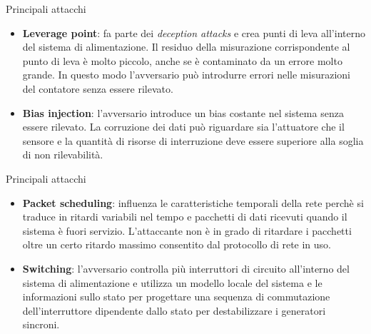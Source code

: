 \documentclass{beamer}
\begin{document}
\begin{frame}{Principali attacchi}
    \begin{itemize}
        \item \textbf{Leverage point}: fa parte dei \textit{deception attacks} e crea punti di leva all'interno del sistema di alimentazione. Il 
        residuo della misurazione corrispondente al punto di leva è molto piccolo, anche se è contaminato da un errore molto grande. In questo modo 
        l'avversario può introdurre errori nelle misurazioni del contatore senza essere rilevato. 
        \item \textbf{Bias injection}: l'avversario introduce un bias costante nel sistema senza essere rilevato. La corruzione dei dati può riguardare
        sia l'attuatore che il sensore e la quantità di risorse di interruzione deve essere superiore alla soglia di non rilevabilità.
    \end{itemize}
\end{frame}

\begin{frame}{Principali attacchi}
    \begin{itemize}
        \item \textbf{Packet scheduling}: influenza le caratteristiche temporali della rete perchè si traduce in ritardi variabili nel 
        tempo e pacchetti di dati ricevuti quando il sistema è fuori servizio. L'attaccante non è in grado di ritardare i pacchetti oltre un certo ritardo
        massimo consentito dal protocollo di rete in uso. 
        \item \textbf{Switching}: l'avversario controlla più interruttori di circuito all'interno del sistema di alimentazione e utilizza un modello locale
        del sistema e le informazioni sullo stato per progettare una sequenza di commutazione dell'interruttore dipendente dallo stato per destabilizzare 
        i generatori sincroni.
    \end{itemize}
\end{frame}
\end{document}
